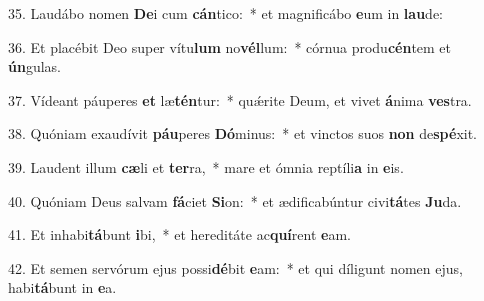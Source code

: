 35. Laudábo nomen \textbf{De}i cum \textbf{cán}tico:~*  et magnificábo \textbf{e}um in \textbf{lau}de:\

36. Et placébit Deo super vítu\textbf{lum} no\textbf{vél}lum:~*  córnua produ\textbf{cén}tem et \textbf{ún}gulas.\

37. Vídeant páuperes \textbf{et} læ\textbf{tén}tur:~*  quǽrite Deum, et vivet \textbf{á}nima \textbf{ves}tra.\

38. Quóniam exaudívit \textbf{páu}peres \textbf{Dó}minus:~*  et vinctos suos \textbf{non} de\textbf{spé}xit.\

39. Laudent illum \textbf{cæ}li et \textbf{ter}ra,~*  mare et ómnia reptíli\textbf{a} in \textbf{e}is.\

40. Quóniam Deus salvam \textbf{fá}ciet \textbf{Si}on:~*  et ædificabúntur civi\textbf{tá}tes \textbf{Ju}da.\

41. Et inhabi\textbf{tá}bunt \textbf{i}bi,~*  et hereditáte ac\textbf{quí}rent \textbf{e}am.\

42. Et semen servórum ejus possi\textbf{dé}bit \textbf{e}am:~*  et qui díligunt nomen ejus, habi\textbf{tá}bunt in \textbf{e}a.\


